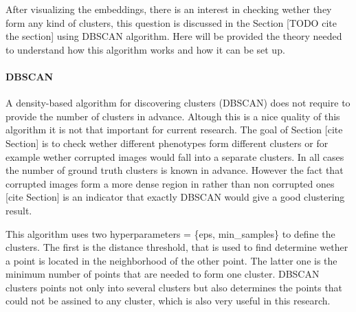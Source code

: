 After visualizing the embeddings, there is an interest in checking wether they form any kind of clusters, this question is discussed in the Section [TODO cite the section] using DBSCAN algorithm. Here will be provided the theory needed to understand how this algorithm works and how it can be set up.
\paragraph{DBSCAN}
A density-based algorithm for discovering clusters (DBSCAN) does not require to provide the number of clusters in advance. Altough this is a nice quality of this algorithm it is not that important for current research. The goal of Section [cite Section] is to check wether different phenotypes form different clusters or for example wether corrupted images would fall into a separate clusters. In all cases the number of ground truth clusters is known in advance. However the fact that corrupted images form a more dense region in rather than non corrupted ones [cite Section] is an indicator that exactly DBSCAN would give a good clustering result. 

This algorithm uses two hyperparameters = \{eps, min\_samples\} to define the clusters. The first is the distance threshold, that is used to find determine wether a point is located in the neighborhood of the other point. The latter one is the minimum number of points that are needed to form one cluster. DBSCAN clusters points not only into several clusters but also determines the points that could not be assined to any cluster, which is also very useful in this research.
